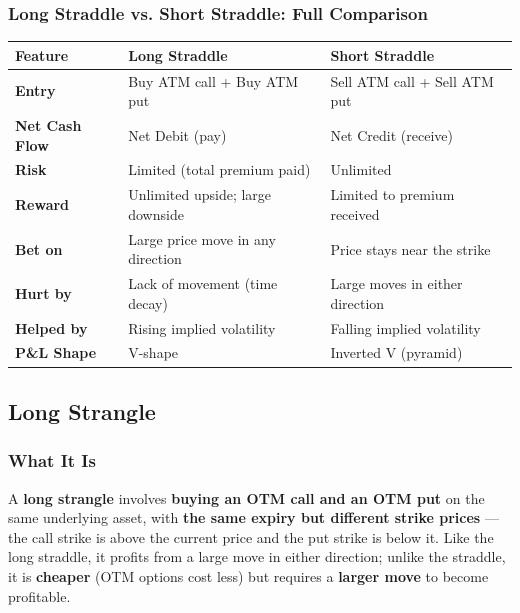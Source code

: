 \documentclass[12pt,openany]{book}
\begin{document}
\subsubsection{Long Straddle vs. Short Straddle: Full Comparison}

\begin{center}
\scriptsize
\setlength{\tabcolsep}{3pt}
\begin{tabular}{|L{4.42cm}|L{4.42cm}|L{4.42cm}|}
\hline
Feature & Long Straddle & Short Straddle \\
\hline
\textbf{Entry} & Buy ATM call + Buy ATM put & Sell ATM call + Sell ATM put \\
\hline
\textbf{Net Cash Flow} & Net Debit (pay) & Net Credit (receive) \\
\hline
\textbf{Risk} & Limited (total premium paid) & Unlimited \\
\hline
\textbf{Reward} & Unlimited upside; large downside & Limited to premium received \\
\hline
\textbf{Bet on} & Large price move in any direction & Price stays near the strike \\
\hline
\textbf{Hurt by} & Lack of movement (time decay) & Large moves in either direction \\
\hline
\textbf{Helped by} & Rising implied volatility & Falling implied volatility \\
\hline
\textbf{P\&L Shape} & V-shape & Inverted V (pyramid) \\
\hline
\end{tabular}
\end{center}



\subsection{Long Strangle}

\subsubsection{What It Is}

A \textbf{long strangle} involves \textbf{buying an OTM call and an OTM put} on the same underlying asset, with \textbf{the same expiry but different strike prices} — the call strike is above the current price and the put strike is below it. Like the long straddle, it profits from a large move in either direction; unlike the straddle, it is \textbf{cheaper} (OTM options cost less) but requires a \textbf{larger move} to become profitable.
\end{document}
